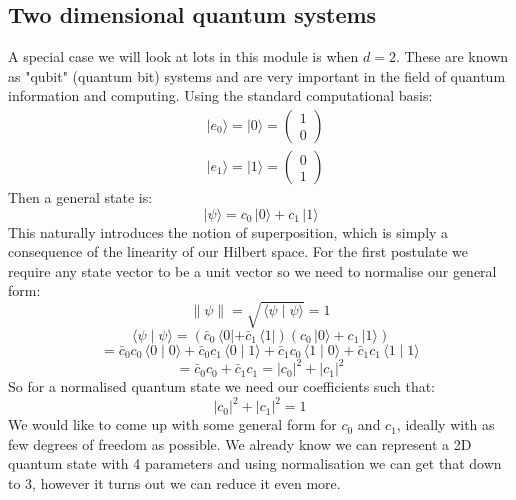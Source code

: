 \documentclass[12pt]{article}
\newcommand{\ket}[1]{\,|#1\rangle}
\newcommand{\bra}[1]{\,\langle #1|}
\newcommand{\braket}[2]{\,\langle #1\mid #2\rangle}
\begin{document}
\subsection*{Two dimensional quantum systems}
A special case we will look at lots in this module is when \(d=2\). These are known as "qubit" (quantum bit) systems and are very important in the field of quantum information and computing. Using the standard computational basis:
\begin{align*}
    &|e_0\rangle =|0\rangle =\begin{pmatrix}
        1 \\ 0
    \end{pmatrix} \\
    &|e_1\rangle =|1\rangle =\begin{pmatrix}
        0 \\ 1
    \end{pmatrix}
\end{align*}
Then a general state is:
\[\ket{\psi}=c_0\ket{0}+c_1\ket{1}\]
This naturally introduces the notion of superposition, which is simply a consequence of the linearity of our Hilbert space. For the first postulate we require any state vector to be a unit vector so we need to normalise our general form:
\[\|\psi\|=\sqrt{\braket{\psi}{\psi}}=1\]
\[\braket{\psi}{\psi}=(\bar{c}_0\bra{0}+\bar{c}_1\bra{1})(c_0\ket{0}+c_1\ket{1})\]
\[=\bar{c}_0c_0\braket{0}{0}+\bar{c}_0c_1\braket{0}{1}+\bar{c}_1c_0\braket{1}{0}+\bar{c}_1c_1\braket{1}{1}\]
\[=\bar{c}_0c_0+\bar{c}_1c_1=|c_0|^2+|c_1|^2\]
So for a normalised quantum state we need our coefficients such that:
\[|c_0|^2+|c_1|^2=1\]
We would like to come up with some general form for \(c_0\) and \(c_1\), ideally with as few degrees of freedom as possible. We already know we can represent a 2D quantum state with 4 parameters and using normalisation we can get that down to 3, however it turns out we can reduce it even more.
\end{document}
